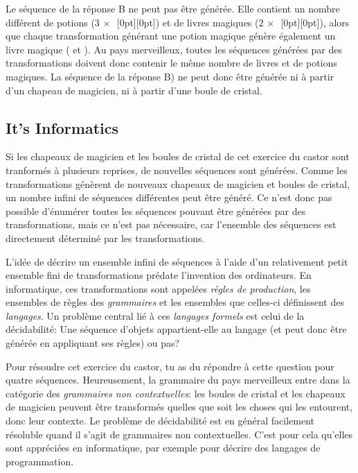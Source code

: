 \documentclass[a4paper,11pt]{report}
\newcommand{\taskGraphicsFolder}{..}
\begin{document}
Le séquence de la réponse B ne peut pas être générée. Elle contient un nombre différent de potions (${3\,\times}$~\raisebox{-0.5ex}[0pt][0pt]{}) et de livres magiques (${2\,\times}$~\raisebox{-0.5ex}[0pt][0pt]{}), alors que chaque transformation générant une potion magique génère également un livre magique (\raisebox{-0.5ex}{} et \raisebox{-0.5ex}{}). Au pays merveilleux, toutes les séquences générées par des transformations doivent donc contenir le même nombre de livres et de potions magiques. La séquence de la réponse B) ne peut donc être générée ni à partir d’un chapeau de magicien, ni à partir d’une boule de cristal.


\subsection*{It’s Informatics}

Si les chapeaux de magicien et les boules de cristal de cet exercice du castor sont tranformés à plusieurs reprises, de nouvelles séquences sont générées. Comme les transformations génèrent de nouveaux chapeaux de magicien et boules de cristal, un nombre infini de séquences différentes peut être généré. Ce n’est donc pas possible d’énumérer toutes les séquences pouvant être générées par des transformations, mais ce n’est pas nécessaire, car l’ensemble des séquences est directement déterminé par les transformations.

L’idée de décrire un ensemble infini de séquences à l’aide d’un relativement petit ensemble fini de transformations prédate l’invention des ordinateurs. En informatique, ces transformations sont appelées \emph{règles de production}, les ensembles de règles des \emph{grammaires} et les ensembles que celles-ci définissent des \emph{langages}. Un problème central lié à ces \emph{langages formels} est celui de la décidabilité: Une séquence d’objets appartient-elle au langage (et peut donc être générée en appliquant ses règles) ou pas?

Pour résoudre cet exercice du castor, tu as du répondre à cette question pour quatre séquences. Heureusement, la grammaire du pays merveilleux entre dans la catégorie des \emph{grammaires non contextuelles}: les boules de cristal et les chapeaux de magicien peuvent être transformés quelles que soit les choses qui les entourent, donc leur contexte. Le problème de décidabilité est en général facilement résoluble quand il s’agit de grammaires non contextuelles. C’est pour cela qu’elles sont appréciées en informatique, par exemple pour décrire des langages de programmation.
\end{document}

